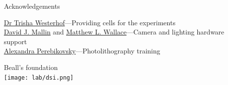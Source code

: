 \begin{frame}[c]{Acknowledgements}
	
	\underline{Dr Trisha Westerhof}---Providing cells for the experiments \\
	\vspace{.15in}
	\underline{David J. Mallin} and \underline{Matthew L. Wallace}---Camera and lighting hardware support \\
	\vspace{.15in}
	\underline{Alexandra Perebikovsky}---Photolithography training \\
	\vspace{.15in}
	
	{\centering
		{\large Beall's foundation} \\
		\vspace{0.3in}
		\texttt{[image: lab/dsi.png]} \\
		\par
	}
	
	
\end{frame}









